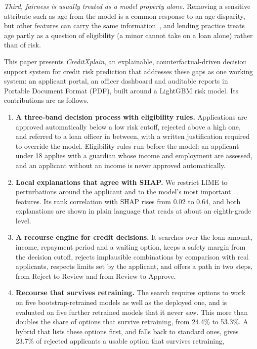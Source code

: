 \emph{Third, fairness is usually treated as a model property alone.} Removing a sensitive attribute such as age from
the model is a common response to an age disparity, but other features can carry the same
information~\cite{dwork2012awareness}, and lending practice treats age partly as a question of eligibility (a minor
cannot take on a loan alone) rather than of risk.

This paper presents \emph{CreditXplain}, an explainable, counterfactual-driven decision support system for credit
risk prediction that addresses these gaps as one working system: an applicant portal, an officer dashboard and
auditable reports in Portable Document Format (PDF), built around a LightGBM risk model. Its contributions are as follows.

\begin{enumerate}
\item \textbf{A three-band decision process with eligibility rules.} Applications are approved automatically below a
low risk cutoff, rejected above a high one, and referred to a loan officer in between, with a written justification
required to override the model. Eligibility rules run before the model: an applicant under 18 applies with a
guardian whose income and employment are assessed, and an applicant without an income is never approved
automatically.
\item \textbf{Local explanations that agree with SHAP.} We restrict LIME to perturbations around the applicant and to
the model's most important features. Its rank correlation with SHAP rises from 0.02 to 0.64, and both explanations
are shown in plain language that reads at about an eighth-grade level.
\item \textbf{A recourse engine for credit decisions.} It searches over the loan amount, income, repayment period and
a waiting option, keeps a safety margin from the decision cutoff, rejects implausible combinations by comparison
with real applicants, respects limits set by the applicant, and offers a path in two steps, from Reject to Review and
from Review to Approve.
\item \textbf{Recourse that survives retraining.} The search requires options to work on five bootstrap-retrained
models as well as the deployed one, and is evaluated on five further retrained models that it never saw. This more
than doubles the share of options that survive retraining, from 24.4\% to 53.3\%. A hybrid that lists these options
first, and falls back to standard ones, gives 23.7\% of rejected applicants a usable option that survives retraining,

\end{enumerate}
